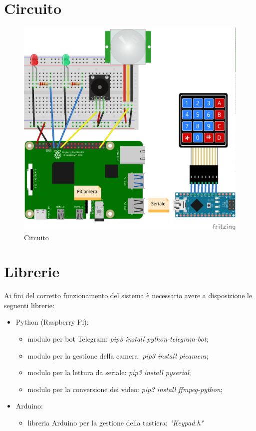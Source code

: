 \documentclass[12pt]{article}
\begin{document}
	\section{Circuito}
	\begin{figure}[h]
		\centering
		\includegraphics[width=4.5in]{circuito}
		\caption{Circuito}
	\end{figure}
	
	\section{Librerie}
	Ai fini del corretto funzionamento del sistema è necessario avere a disposizione le seguenti 
	librerie:
	\begin{itemize}
		\item Python (Raspberry Pi):
		\begin{itemize}
			\item modulo per bot Telegram: \textit{pip3 install python-telegram-bot};
			\item modulo per la gestione della camera: \textit{pip3 install picamera};
			\item modulo per la lettura da seriale: \textit{pip3 install pyserial};
			\item modulo per la conversione dei video: \textit{pip3 install ffmpeg-python};
		\end{itemize}
		\item Arduino:
		\begin{itemize}
			\item libreria Arduino per la gestione della tastiera: \textit{"Keypad.h"}
		\end{itemize}
	\end{itemize}
\end{document}
